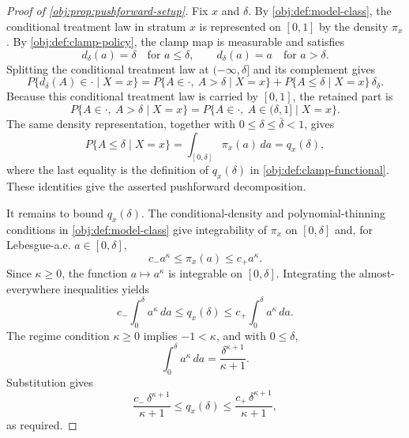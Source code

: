 \begin{proof}[Proof of \cref{obj:prop:pushforward-setup}]
Fix \(x\) and \(\delta\).  By \cref{obj:def:model-class}, the conditional treatment law in stratum \(x\) is represented on \([0,1]\) by the density \(\pi_x\).  By \cref{obj:def:clamp-policy}, the clamp map is measurable and satisfies
\[
d_\delta(a)=\delta\quad\text{for }a\leq\delta,
\qquad
d_\delta(a)=a\quad\text{for }a>\delta .
\]
Splitting the conditional treatment law at \((-\infty,\delta]\) and its complement gives
\[
P\{d_\delta(A)\in\cdot\mid X=x\}
=
P\{A\in\cdot,\ A>\delta\mid X=x\}
+
P\{A\leq\delta\mid X=x\}\,\delta_\delta .
\]%
Because this conditional treatment law is carried by \([0,1]\), the retained part is
\[
P\{A\in\cdot,\ A>\delta\mid X=x\}
=
P\{A\in\cdot,\ A\in(\delta,1]\mid X=x\}.
\]%
The same density representation, together with \(0\leq\delta\leq\bar\delta<1\), gives
\[
P\{A\leq\delta\mid X=x\}
=
\int_{[0,\delta]}\pi_x(a)\,da
=
q_x(\delta),
\]%
where the last equality is the definition of \(q_x(\delta)\) in \cref{obj:def:clamp-functional}.  These identities give the asserted pushforward decomposition.

It remains to bound \(q_x(\delta)\).  The conditional-density and polynomial-thinning conditions in \cref{obj:def:model-class} give integrability of \(\pi_x\) on \([0,\delta]\) and, for Lebesgue-a.e. \(a\in[0,\delta]\),
\[
c_-a^\kappa\leq \pi_x(a)\leq c_+a^\kappa .
\]%
Since \(\kappa\geq0\), the function \(a\mapsto a^\kappa\) is integrable on \([0,\delta]\).  Integrating the almost-everywhere inequalities yields
\[
c_-\int_0^\delta a^\kappa\,da
\leq
q_x(\delta)
\leq
c_+\int_0^\delta a^\kappa\,da .
\]%
The regime condition \(\kappa\geq0\) implies \(-1<\kappa\), and with \(0\leq\delta\),
\[
\int_0^\delta a^\kappa\,da
=
\frac{\delta^{\kappa+1}}{\kappa+1}.
\]%
Substitution gives
\[
\frac{c_-\,\delta^{\kappa+1}}{\kappa+1}
\leq
q_x(\delta)
\leq
\frac{c_+\,\delta^{\kappa+1}}{\kappa+1},
\]
as required.
\end{proof}

